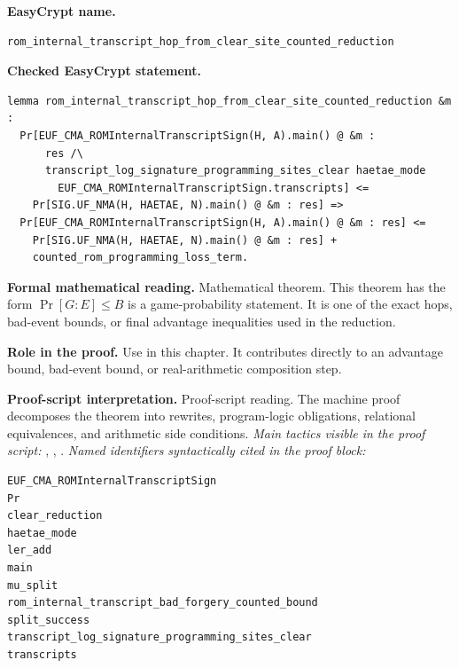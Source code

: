 \begin{formaltheorem}
\noindent\textbf{EasyCrypt name.}
\begin{lstlisting}[language=EasyCrypt,basicstyle=\ttfamily\scriptsize]
rom_internal_transcript_hop_from_clear_site_counted_reduction
\end{lstlisting}
\noindent\textbf{Checked EasyCrypt statement.}
\begin{lstlisting}[language=EasyCrypt,basicstyle=\ttfamily\scriptsize]
lemma rom_internal_transcript_hop_from_clear_site_counted_reduction &m :
  Pr[EUF_CMA_ROMInternalTranscriptSign(H, A).main() @ &m :
      res /\
      transcript_log_signature_programming_sites_clear haetae_mode
        EUF_CMA_ROMInternalTranscriptSign.transcripts] <=
    Pr[SIG.UF_NMA(H, HAETAE, N).main() @ &m : res] =>
  Pr[EUF_CMA_ROMInternalTranscriptSign(H, A).main() @ &m : res] <=
    Pr[SIG.UF_NMA(H, HAETAE, N).main() @ &m : res] +
    counted_rom_programming_loss_term.
\end{lstlisting}
\noindent\textbf{Formal mathematical reading.}
Mathematical theorem. This theorem has the form \(\Pr[G:E] \le B\) is a game-probability statement.  It is one of the exact hops, bad-event bounds, or final advantage inequalities used in the reduction.

\noindent\textbf{Role in the proof.}
Use in this chapter. It contributes directly to an advantage bound, bad-event bound, or real-arithmetic composition step.

\noindent\textbf{Proof-script interpretation.}
Proof-script reading. The machine proof decomposes the theorem into rewrites, program-logic obligations, relational equivalences, and arithmetic side conditions.
\emph{Main tactics visible in the proof script:} \ec{have}, \ec{rewrite}, \ec{apply}.
\emph{Named identifiers syntactically cited in the proof block:}
\begin{lstlisting}[language=EasyCrypt,basicstyle=\ttfamily\scriptsize]
EUF_CMA_ROMInternalTranscriptSign
Pr
clear_reduction
haetae_mode
ler_add
main
mu_split
rom_internal_transcript_bad_forgery_counted_bound
split_success
transcript_log_signature_programming_sites_clear
transcripts
\end{lstlisting}

\end{formaltheorem}

